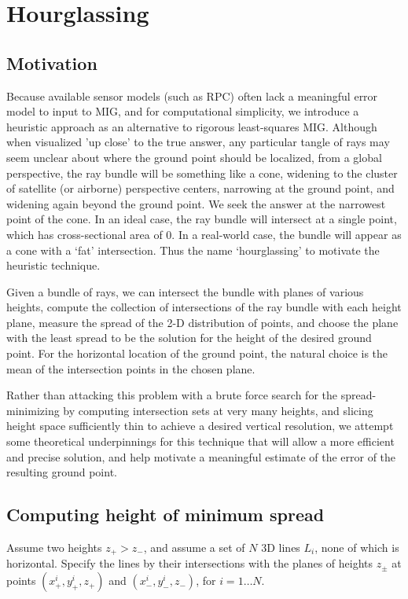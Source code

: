 \documentclass[11pt]{amsart}
\begin{document}
\section{Hourglassing\label{hourglassing}}
\subsection{Motivation}
Because available sensor models (such as RPC) often lack a meaningful
error model to input to MIG, and for computational simplicity, we
introduce a heuristic approach as an alternative to rigorous
least-squares MIG. Although when visualized 'up close' to the true
answer, any particular tangle of rays may seem unclear about where the
ground point should be localized, from a global perspective, the ray
bundle will be something like a cone, widening to the cluster of
satellite (or airborne) perspective centers, narrowing at the ground
point, and widening again beyond the ground point. We seek the answer
at the narrowest point of the cone. In an ideal case, the ray bundle
will intersect at a single point, which has cross-sectional area of
0. In a real-world case, the bundle will appear as a cone with a `fat'
intersection. Thus the name `hourglassing' to motivate the heuristic
technique.

Given a bundle of rays, we can intersect the bundle with planes of
various heights, compute the collection of intersections of the ray
bundle with each height plane, measure the spread of the 2-D
distribution of points, and choose the plane with the least spread to
be the solution for the height of the desired ground point. For the
horizontal location of the ground point, the natural choice is the
mean of the intersection points in the chosen plane.

Rather than attacking this problem with a brute force search for the
spread-minimizing by computing intersection sets at very many heights,
and slicing height space sufficiently thin to achieve a desired
vertical resolution, we attempt some theoretical underpinnings for
this technique that will allow a more efficient and precise solution,
and help motivate a meaningful estimate of the error of the resulting
ground point.

\subsection{Computing height of minimum spread}
Assume two heights $z_{+} > z_{-}$, and assume a set of $N$ 3D lines
$L_i$, none of which is horizontal. Specify the lines by their
intersections with the planes of heights $z_\pm$ at points
$(x_{+}^{i},y_{+}^{i}, z_+)$ and $(x_{-}^{i},y_{-}^{i}, z_-)$, for
$i=1\ldots N$.
\end{document}
